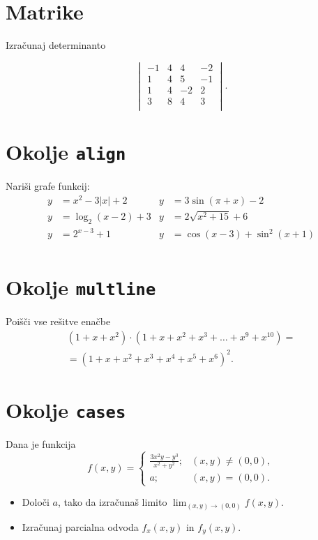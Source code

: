 \documentclass[a4paper,12pt]{article}
\begin{document}
\section*{Matrike}
Izračunaj determinanto

$$
\begin{vmatrix}
   -1 & 4 & 4 & -2 \\
    1 & 4 & 5 & -1 \\
    1 & 4 & -2 & 2 \\
    3 & 8 & 4 & 3 \\
\end{vmatrix}.
$$
   

\section*{Okolje \texttt{align}}
Nariši grafe funkcij:
\begin{align*}
y &= x^2 - 3|x| + 2    &y &= 3 \sin(\pi+x) - 2\\
y &= \log_2(x-2) + 3   &y &= 2 \sqrt{x^2+15} + 6\\
y &= 2^{x-3} + 1       &y &= \cos(x-3) + \sin^2(x+1)\\
\end{align*}

\section*{Okolje \texttt{multline}}
Poišči vse rešitve enačbe
\begin{multline*}
(1+x+x^2) \cdot (1+x+x^2+x^3+\ldots+x^9+x^{10}) =\\
=(1+x+x^2+x^3+x^4+x^5+x^6)^2.
\end{multline*}


\section*{Okolje \texttt{cases}}
Dana je funkcija
\[
f(x, y) = \begin{cases}
  \frac{3x^2y - y^3}{x^2 + y^2}; & (x, y) \neq (0, 0), \\
  a; & (x, y) = (0, 0).
\end{cases}
\]
\begin{itemize}
\item Določi \(a\), tako da izračunaš limito \( \lim_{(x,y)\to(0,0)} f(x,y) \).
\item Izračunaj parcialna odvoda \(f_x(x,y)\) in \(f_y(x,y)\).
\end{itemize}
\end{document}
